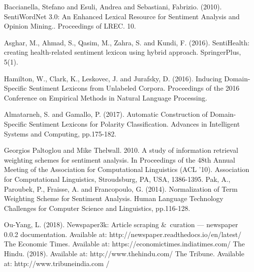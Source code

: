 \documentclass[conference]{IEEEtran}
\begin{document}
\begin{thebibliography}{100}
	Baccianella, Stefano and Esuli, Andrea and Sebastiani, Fabrizio. (2010). SentiWordNet 3.0: An Enhanced Lexical Resource for Sentiment Analysis and Opinion Mining.. Proceedings of LREC. 10.
	
	Asghar, M., Ahmad, S., Qasim, M., Zahra, S. and Kundi, F. (2016). SentiHealth: creating health-related sentiment lexicon using hybrid approach. SpringerPlus, 5(1). 
	
	Hamilton, W., Clark, K., Leskovec, J. and Jurafsky, D. (2016). Inducing Domain-Specific Sentiment Lexicons from Unlabeled Corpora. Proceedings of the 2016 Conference on Empirical Methods in Natural Language Processing.
	
	Almatarneh, S. and Gamallo, P. (2017). Automatic Construction of Domain-Specific Sentiment Lexicons for Polarity Classification. Advances in Intelligent Systems and Computing, pp.175-182.
	
	Georgios Paltoglou and Mike Thelwall. 2010. A study of information retrieval weighting schemes for sentiment analysis. In Proceedings of the 48th Annual Meeting of the Association for Computational Linguistics (ACL '10). Association for Computational Linguistics, Stroudsburg, PA, USA, 1386-1395.
	Pak, A., Paroubek, P., Fraisse, A. and Francopoulo, G. (2014). Normalization of Term Weighting Scheme for Sentiment Analysis. Human Language Technology Challenges for Computer Science and Linguistics, pp.116-128. 
	
	 Ou-Yang, L. (2018). Newspaper3k: Article scraping \&\ curation — newspaper 0.0.2 documentation. Available at: http://newspaper.readthedocs.io/en/latest/
	The Economic Times. Available at: https://economictimes.indiatimes.com/
	The Hindu. (2018). Available at: http://www.thehindu.com/
	The Tribune. Available at: http://www.tribuneindia.com /
	

\end{thebibliography}
\end{document}
